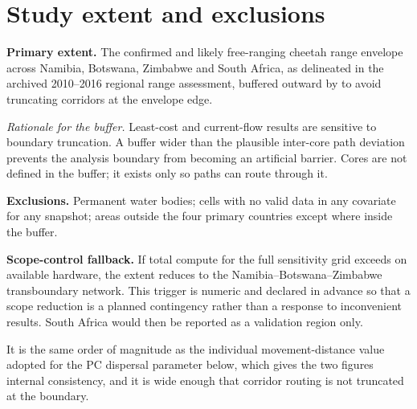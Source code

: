 \section{Study extent and exclusions}

\textbf{Primary extent.} The confirmed and likely free-ranging cheetah range
envelope across Namibia, Botswana, Zimbabwe and South Africa, as delineated in
the archived 2010--2016 regional range assessment, buffered outward by
 to avoid truncating corridors at the envelope edge.

\emph{Rationale for the buffer.} Least-cost and current-flow results are
sensitive to boundary truncation. A buffer wider than the plausible inter-core
path deviation prevents the analysis boundary from becoming an artificial
barrier. Cores are not defined in the buffer; it exists only so paths can route
through it.

\textbf{Exclusions.} Permanent water bodies; cells with no valid data in any
covariate for any snapshot; areas outside the four primary countries except
where inside the buffer.

\textbf{Scope-control fallback.} If total compute for the full sensitivity grid
exceeds  on available hardware, the extent reduces to the
Namibia--Botswana--Zimbabwe transboundary network. This trigger is numeric and
declared in advance so that a scope reduction is a planned contingency rather
than a response to inconvenient results. South Africa would then be reported as
a validation region only.

 It is the same order of
magnitude as the individual movement-distance value adopted for the PC
dispersal parameter below, which gives the two figures internal consistency,
and it is wide enough that corridor routing is not truncated at the boundary.


